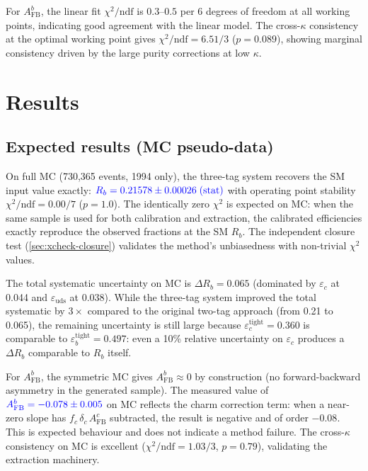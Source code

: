 \documentclass[11pt,a4paper]{article}
\newcommand{\measured}[1]{\textcolor{blue}{#1}}
\begin{document}
For $A_\text{FB}^b$, the linear fit $\chi^2/\text{ndf}$ is
$0.3$--$0.5$ per 6 degrees of freedom at all working points,
indicating good agreement with the linear model.
The cross-$\kappa$ consistency at the optimal working point gives
$\chi^2/\text{ndf} = 6.51/3$ ($p = 0.089$), showing marginal
consistency driven by the large purity corrections at low $\kappa$.

\section{Results}
\label{sec:results}

\subsection{Expected results (MC pseudo-data)}
\label{sec:results:expected}

On full MC (730,365 events, 1994 only), the three-tag system
recovers the SM input value exactly:
$\measured{R_b = 0.21578 \pm 0.00026\;\text{(stat)}}$
with operating point stability
$\chi^2/\text{ndf} = 0.00/7$ ($p = 1.0$).
The identically zero $\chi^2$ is expected on MC: when the same
sample is used for both calibration and extraction, the calibrated
efficiencies exactly reproduce the observed fractions at the SM
$R_b$.
The independent closure test
(\cref{sec:xcheck-closure}) validates the method's unbiasedness
with non-trivial $\chi^2$ values.

The total systematic uncertainty on MC is
$\Delta R_b = 0.065$ (dominated by $\varepsilon_c$ at 0.044 and
$\varepsilon_\text{uds}$ at 0.038).
While the three-tag system improved the total systematic by
$3\times$ compared to the original two-tag approach (from 0.21 to
0.065), the remaining uncertainty is still large because
$\varepsilon_c^\text{tight} = 0.360$ is comparable to
$\varepsilon_b^\text{tight} = 0.497$: even a 10\% relative
uncertainty on $\varepsilon_c$ produces a $\Delta R_b$ comparable
to $R_b$ itself.

For $A_\text{FB}^b$, the symmetric MC gives
$A_\text{FB}^b \approx 0$ by construction
(no forward-backward asymmetry in the generated sample).
The measured value of $\measured{A_\text{FB}^b = -0.078 \pm 0.005}$
on MC reflects the charm correction term: when a near-zero slope
has $f_c\,\delta_c\,A_\text{FB}^c$ subtracted, the result is
negative and of order $-0.08$.
This is expected behaviour and does not indicate a method failure.
The cross-$\kappa$ consistency on MC is excellent
($\chi^2/\text{ndf} = 1.03/3$, $p = 0.79$), validating the
extraction machinery.
\end{document}
